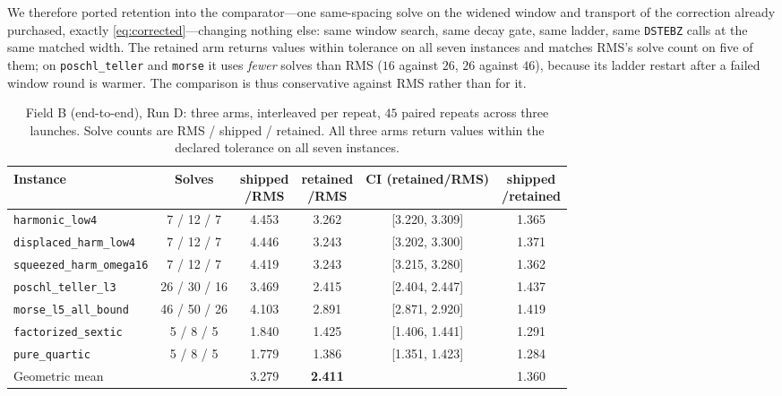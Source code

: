 \documentclass[twocolumn,10pt,a4paper]{article}
\theoremstyle{plain}
\theoremstyle{definition}
\begin{document}
We therefore ported retention into the comparator---one same-spacing solve on
the widened window and transport of the correction already purchased, exactly
\eqref{eq:corrected}---changing nothing else: same window search, same decay
gate, same ladder, same \texttt{DSTEBZ} calls at the same matched width. The
retained arm returns values within tolerance on all seven instances and matches
RMS's solve count on five of them; on \texttt{poschl\_teller} and
\texttt{morse} it uses \emph{fewer} solves than RMS ($16$ against $26$, $26$
against $46$), because its ladder restart after a failed window round is warmer.
The comparison is thus conservative against RMS rather than for it.

\begin{table}[t]
\centering\small
\caption{Field B (end-to-end), Run D: three arms, interleaved per repeat,
$45$ paired repeats across three launches. Solve counts are RMS / shipped /
retained. All three arms return values within the declared tolerance on all
seven instances.}
\label{tab:e2e}
\begin{tabular}{lccccc}
\toprule
Instance & Solves & \shortstack{shipped\\/RMS} & \shortstack{retained\\/RMS} & CI (retained/RMS) & \shortstack{shipped\\/retained} \\
\midrule
\texttt{harmonic\_low4}          & 7 / 12 / 7  & 4.453 & 3.262 & [3.220, 3.309] & 1.365\\
\texttt{displaced\_harm\_low4}   & 7 / 12 / 7  & 4.446 & 3.243 & [3.202, 3.300] & 1.371\\
\texttt{squeezed\_harm\_omega16} & 7 / 12 / 7  & 4.419 & 3.243 & [3.215, 3.280] & 1.362\\
\texttt{poschl\_teller\_l3}      & 26 / 30 / 16 & 3.469 & 2.415 & [2.404, 2.447] & 1.437\\
\texttt{morse\_l5\_all\_bound}   & 46 / 50 / 26 & 4.103 & 2.891 & [2.871, 2.920] & 1.419\\
\texttt{factorized\_sextic}      & 5 / 8 / 5   & 1.840 & 1.425 & [1.406, 1.441] & 1.291\\
\texttt{pure\_quartic}           & 5 / 8 / 5   & 1.779 & 1.386 & [1.351, 1.423] & 1.284\\
\midrule
Geometric mean & & 3.279 & \textbf{2.411} & & 1.360\\
\bottomrule
\end{tabular}
\end{table}
\end{document}
